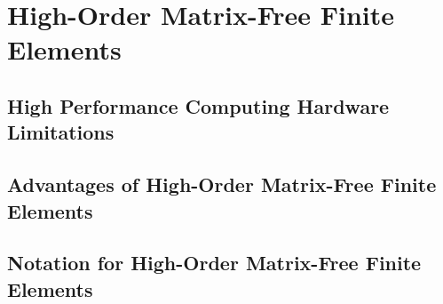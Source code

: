 \chapter{High-Order Matrix-Free Finite Elements}\label{ch:HighOrderFEM}


\section{High Performance Computing Hardware Limitations}\label{sec:highorderwhy}


\section{Advantages of High-Order Matrix-Free Finite Elements}\label{sec:highorderbenefits}


\section{Notation for High-Order Matrix-Free Finite Elements}\label{sec:highordernotation}

